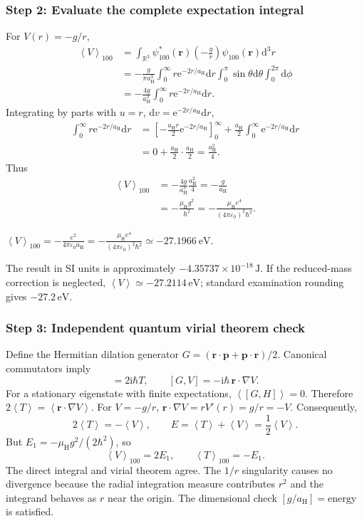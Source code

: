\documentclass[11pt,a4paper]{article}
\newcommand{\key}[1]{\begin{resultbox}\centering\(\displaystyle #1\)\end{resultbox}}
\newcommand{\dd}{\mathrm{d}}
\newcommand{\iu}{\mathrm{i}}
\newcommand{\ee}{\mathrm{e}}
\newcommand{\avg}[1]{\left\langle #1\right\rangle}
\newcommand{\R}{\mathbb R}
\newcommand{\aH}{a_{\mathrm H}}
\newcommand{\mH}{\mu_{\mathrm H}}
\newcommand{\eps}{\varepsilon_0}
\begin{document}
\subsubsection*{Step 2: Evaluate the complete expectation integral}
For \(V(r)=-g/r\),
\begin{align}
\avg V_{100}&=\int_{\R^3}\psi_{100}^*(\mathbf r)\left(-\frac gr\right)\psi_{100}(\mathbf r)\dd^3r\\
&=-\frac{g}{\pi\aH^3}\int_0^\infty r\ee^{-2r/\aH}\dd r\int_0^\pi\sin\theta\dd\theta\int_0^{2\pi}\dd\phi\\
&=-\frac{4g}{\aH^3}\int_0^\infty r\ee^{-2r/\aH}\dd r.
\end{align}
Integrating by parts with \(u=r\), \(\dd v=\ee^{-2r/\aH}\dd r\),
\begin{align}
\int_0^\infty r\ee^{-2r/\aH}\dd r&=\left[-\frac{\aH r}2\ee^{-2r/\aH}\right]_0^\infty+\frac{\aH}2\int_0^\infty\ee^{-2r/\aH}\dd r\\
&=0+\frac{\aH}2\cdot\frac{\aH}2=\frac{\aH^2}{4}.
\end{align}
Thus
\begin{align}
\avg V_{100}&=-\frac{4g}{\aH^3}\frac{\aH^2}{4}=-\frac g{\aH}\\
&=-\frac{\mH g^2}{\hbar^2}=-\frac{\mH e^4}{(4\pi\eps)^2\hbar^2}.
\end{align}
\key{\boxed{\avg V_{100}=-\frac{e^2}{4\pi\eps\aH}=-\frac{\mH e^4}{(4\pi\eps)^2\hbar^2}\simeq-27.1966\ \mathrm{eV}.}}
The result in SI units is approximately \(-4.35737\times10^{-18}\,\mathrm J\). If the reduced-mass correction is neglected, \(\avg V\simeq-27.2114\,\mathrm{eV}\); standard examination rounding gives \(-27.2\,\mathrm{eV}\).

\subsubsection*{Step 3: Independent quantum virial theorem check}
Define the Hermitian dilation generator \(G=(\mathbf r\cdot\mathbf p+\mathbf p\cdot\mathbf r)/2\). Canonical commutators imply
\begin{equation}[G,T]=2\iu\hbar T,\qquad [G,V]=-\iu\hbar\,\mathbf r\cdot\nabla V.\end{equation}
For a stationary eigenstate with finite expectations, \(\avg{[G,H]}=0\). Therefore \(2\avg T=\avg{\mathbf r\cdot\nabla V}\). For \(V=-g/r\), \(\mathbf r\cdot\nabla V=rV'(r)=g/r=-V\). Consequently,
\begin{equation}\boxed{2\avg T=-\avg V,\qquad E=\avg T+\avg V=\frac12\avg V.}\end{equation}
But \(E_1=-\mH g^2/(2\hbar^2)\), so
\begin{equation}\boxed{\avg V_{100}=2E_1,\qquad \avg T_{100}=-E_1.}\end{equation}
The direct integral and virial theorem agree. The \(1/r\) singularity causes no divergence because the radial integration measure contributes \(r^2\) and the integrand behaves as \(r\) near the origin. The dimensional check \([g/\aH]=\text{energy}\) is satisfied.
\end{document}

